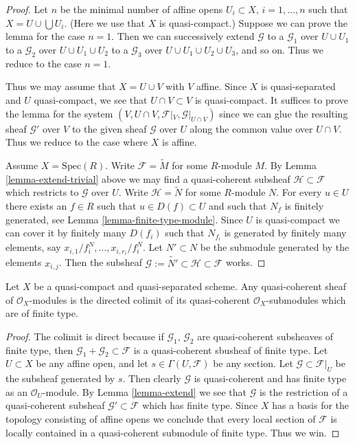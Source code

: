 \begin{proof}
Let $n$ be the minimal number of affine opens $U_i \subset X$,
$i = 1, \ldots , n$ such that $X = U \cup \bigcup U_i$.
(Here we use that $X$ is quasi-compact.) Suppose
we can prove the lemma for the case $n = 1$. Then we can successively
extend $\mathcal{G}$
to a $\mathcal{G}_1$ over $U \cup U_1$
to a $\mathcal{G}_2$ over $U \cup U_1 \cup U_2$
to a $\mathcal{G}_3$ over $U \cup U_1 \cup U_2 \cup U_3$,
and so on.
Thus we reduce to the case $n = 1$.

\medskip\noindent
Thus we may assume that $X = U \cup V$ with $V$ affine.
Since $X$ is quasi-separated and $U$ quasi-compact,
we see that $U \cap V \subset V$ is quasi-compact.
It suffices to prove the lemma for
the system $(V, U \cap V, \mathcal{F}|_V, \mathcal{G}|_{U \cap V})$
since we can glue the resulting sheaf $\mathcal{G}'$ over $V$
to the given sheaf $\mathcal{G}$ over $U$ along the common value
over $U \cap V$.
Thus we reduce to the case where $X$ is affine.

\medskip\noindent
Assume $X = \text{Spec}(R)$. Write $\mathcal{F} = \widetilde M$
for some $R$-module $M$. By Lemma \ref{lemma-extend-trivial} above we may
find a quasi-coherent subsheaf $\mathcal{H} \subset \mathcal{F}$
which restricts to $\mathcal{G}$ over $U$.
Write $\mathcal{H} = \widetilde N$ for some $R$-module $N$.
For every $u \in U$ there exists an $f \in R$ such that
$u \in D(f) \subset U$ and such that $N_f$ is finitely generated,
see Lemma \ref{lemma-finite-type-module}.
Since $U$ is quasi-compact we can cover it by finitely
many $D(f_i)$ such that $N_{f_i}$ is generated by
finitely many elements, say $x_{i, 1}/f_i^N, \ldots, x_{i, r_i}/f_i^N$.
Let $N' \subset N$ be the submodule generated by the elements
$x_{i, j}$. Then the subsheaf
$\mathcal{G} := \widetilde{N'} \subset \mathcal{H} \subset \mathcal{F}$
works.
\end{proof}

\begin{lemma}
\label{lemma-quasi-coherent-colimit-finite-type}
Let $X$ be a quasi-compact and quasi-separated scheme.
Any quasi-coherent sheaf of $\mathcal{O}_X$-modules
is the directed colimit of its quasi-coherent
$\mathcal{O}_X$-submodules which are of finite type.
\end{lemma}

\begin{proof}
The colimit is direct because if $\mathcal{G}_1$, $\mathcal{G}_2$
are quasi-coherent subsheaves of finite type, then
$\mathcal{G}_1 + \mathcal{G}_2 \subset \mathcal{F}$ is
a quasi-coherent sbusheaf of finite type.
Let $U \subset X$ be any affine open, and let
$s \in \Gamma(U, \mathcal{F})$ be any section.
Let $\mathcal{G} \subset \mathcal{F}|_U$ be the
subsheaf generated by $s$. Then clearly $\mathcal{G}$
is quasi-coherent and has finite type as an $\mathcal{O}_U$-module.
By Lemma \ref{lemma-extend} we see that $\mathcal{G}$ is the restriction
of a quasi-coherent subsheaf $\mathcal{G}' \subset \mathcal{F}$
which has finite type. Since $X$ has a basis for the topology consisting
of affine opens we conclude that every local section of
$\mathcal{F}$ is locally contained in a quasi-coherent submodule
of finite type. Thus we win.
\end{proof}

